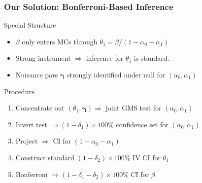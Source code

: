 \documentclass[handout]{beamer}
\begin{document}
\begin{frame}
  \frametitle{Our Solution: Bonferroni-Based Inference}
  

  \begin{block}{Special Structure}
    \begin{itemize}
      \item $\beta$ only enters MCs through $\theta_1 = \beta/ (1 - \alpha_0 - \alpha_1)$
      \item Strong instrument $\Rightarrow$ inference for $\theta_1$ is standard.
      \item Nuisance pars $\boldsymbol{\gamma}$ strongly identified under null for $(\alpha_0, \alpha_1)$
    \end{itemize}
    \pause

    \begin{block}{Procedure}
      \begin{enumerate}
        \item Concentrate out $(\theta_1, \boldsymbol{\gamma}) \Rightarrow$ joint GMS test for $(\alpha_0, \alpha_1)$ \pause 
        \item Invert test $\Rightarrow (1 - \delta_1)\times 100\%$ confidence set for $(\alpha_0, \alpha_1)$ \pause
        \item Project $\Rightarrow$ CI for $(1 - \alpha_0 - \alpha_1)$ \pause
        \item Construct standard $(1 - \delta_2)\times 100\%$ IV CI for $\theta_1$ \pause
        \item Bonferroni $\Rightarrow (1 - \delta_1 - \delta_2)\times 100\%$ CI for $\beta$
      \end{enumerate}
    \end{block}
    
  \end{block}

  
\end{frame}
%
%  
\end{document}
